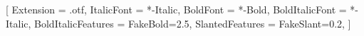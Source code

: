 \usepackage[margin=2.0cm,a5paper]{geometry}
\usepackage{fontspec}
\usepackage{graphicx}
\usepackage[greek,english,portuges]{babel}   %
\usepackage{indentfirst}

\setmainfont{QTOldGoudy}[
    Extension               = .otf,
    ItalicFont              = *-Italic,
    BoldFont                = *-Bold,
    BoldItalicFont          = *-Italic,
    BoldItalicFeatures      = {FakeBold=2.5},
    SlantedFeatures         = {FakeSlant=0.2},
]





